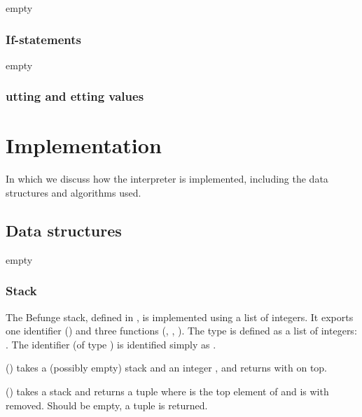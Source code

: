 \documentclass[12pt, a4paper]{article}
\begin{document}
empty

\subsubsection{If-statements}

empty

\subsubsection{utting and etting values}

\section{Implementation}
\label{sec:impl}

In which we discuss how the interpreter is implemented, including the data structures and algorithms used.

\subsection{Data structures}
\label{sec:structures}

empty

\subsubsection{Stack}
\label{sec:structstack}

The Befunge stack, defined in , is implemented using a list of integers. It exports one identifier () and three functions (, , ). The type  is defined as a list of integers: . The identifier  (of type ) is identified simply as .

\vspace{6pt}
\noindent
{} () takes a (possibly empty) stack  and an integer , and returns  with  on top.

\vspace{6pt}
\noindent
{} () takes a stack  and returns a tuple  where  is the top element of  and  is  with  removed. Should  be empty, a tuple  is returned.
\end{document}
